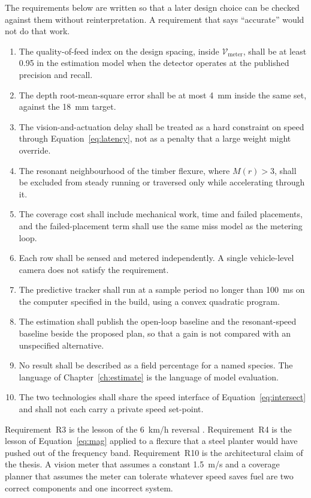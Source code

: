The requirements below are written so that a later design choice can be checked against them without reinterpretation. A requirement that says ``accurate'' would not do that work.

\begin{enumerate}[label=\textbf{R\arabic*.}]
\item The quality-of-feed index on the design spacing, inside \(\mathcal{V}_{\mathrm{meter}}\), shall be at least \num{0.95} in the estimation model when the detector operates at the published precision and recall.
\item The depth root-mean-square error shall be at most \SI{4}{mm} inside the same set, against the \SI{18}{mm} target.
\item The vision-and-actuation delay shall be treated as a hard constraint on speed through Equation~\eqref{eq:latency}, not as a penalty that a large weight might override.
\item The resonant neighbourhood of the timber flexure, where \(M(r)>3\), shall be excluded from steady running or traversed only while accelerating through it.
\item The coverage cost shall include mechanical work, time and failed placements, and the failed-placement term shall use the same miss model as the metering loop.
\item Each row shall be sensed and metered independently. A single vehicle-level camera does not satisfy the requirement.
\item The predictive tracker shall run at a sample period no longer than \SI{100}{ms} on the computer specified in the build, using a convex quadratic program.
\item The estimation shall publish the open-loop baseline and the resonant-speed baseline beside the proposed plan, so that a gain is not compared with an unspecified alternative.
\item No result shall be described as a field percentage for a named species. The language of Chapter~\ref{ch:estimate} is the language of model evaluation.
\item The two technologies shall share the speed interface of Equation~\eqref{eq:intersect} and shall not each carry a private speed set-point.
\end{enumerate}

Requirement~R3 is the lesson of the \SI{6}{km/h} reversal \cite{borja2021}. Requirement~R4 is the lesson of Equation~\eqref{eq:mag} applied to a flexure that a steel planter would have pushed out of the frequency band. Requirement~R10 is the architectural claim of the thesis. A vision meter that assumes a constant \SI{1.5}{m/s} and a coverage planner that assumes the meter can tolerate whatever speed saves fuel are two correct components and one incorrect system.

